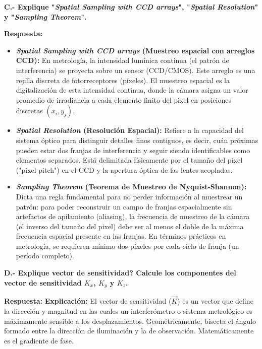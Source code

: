 \documentclass[12pt,letterpaper]{article}
\begin{document}
	\vspace{0.8cm}
	\noindent \textbf{C.- Explique "\textit{Spatial Sampling with CCD arrays}", "\textit{Spatial Resolution}" y "\textit{Sampling Theorem}".}
	
	\textbf{Respuesta:}
	\begin{itemize}
		\item \textbf{\textit{Spatial Sampling with CCD arrays} (Muestreo espacial con arreglos CCD):} En metrología, la intensidad lumínica continua (el patrón de interferencia) se proyecta sobre un sensor (CCD/CMOS). Este arreglo es una rejilla discreta de fotorreceptores (píxeles). El muestreo espacial es la digitalización de esta intensidad continua, donde la cámara asigna un valor promedio de irradiancia a cada elemento finito del pixel en posiciones discretas $(x_i, y_j)$.
		\item \textbf{\textit{Spatial Resolution} (Resolución Espacial):} Refiere a la capacidad del sistema óptico para distinguir detalles finos contiguos, es decir, cuán próximas pueden estar dos franjas de interferencia y seguir siendo identificables como elementos separados. Está delimitada físicamente por el tamaño del píxel ("pixel pitch") en el CCD y la apertura óptica de las lentes acopladas.
		\item \textbf{\textit{Sampling Theorem} (Teorema de Muestreo de Nyquist-Shannon):} Dicta una regla fundamental para no perder información al muestrear un patrón: para poder reconstruir un campo de franjas espacialmente sin artefactos de apilamiento (aliasing), la frecuencia de muestreo de la cámara (el inverso del tamaño del pixel) debe ser al menos el doble de la máxima frecuencia espacial presente en las franjas. En términos prácticos en metrología, se requieren mínimo dos píxeles por cada ciclo de franja (un período completo).
	\end{itemize}
	
	\vspace{0.8cm}
	\noindent \textbf{D.- Explique vector de sensitividad? Calcule los componentes del vector de sensitividad $K_x$, $K_y$ y $K_z$.}
	
	\textbf{Respuesta:}
	\textbf{Explicación:} El vector de sensitividad ($\vec{K}$) es un vector que define la dirección y magnitud en las cuales un interferómetro o sistema metrológico es máximamente sensible a los desplazamientos. Geométricamente, bisecta el ángulo formado entre la dirección de iluminación y la de observación. Matemáticamente es el gradiente de fase.
	
\end{document}
